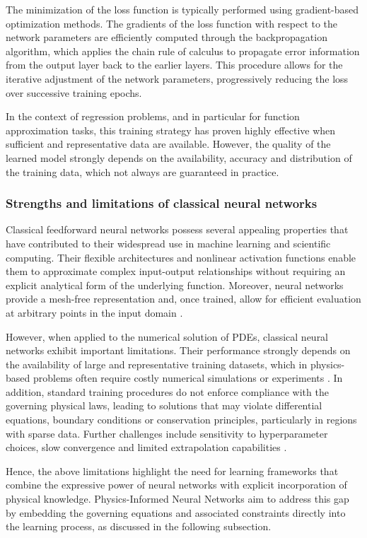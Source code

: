 \documentclass[final,1p,times]{elsarticle}
\theoremstyle{definition}
\begin{document}
The minimization of the loss function is typically performed using gradient-based optimization methods. The gradients of the loss function with respect to the network parameters are efficiently computed through the backpropagation algorithm, which applies the chain rule of calculus to propagate error information from the output layer back to the earlier layers. This procedure allows for the iterative adjustment of the network parameters, progressively reducing the loss over successive training epochs.

In the context of regression problems, and in particular for function approximation tasks, this training strategy has proven highly effective when sufficient and representative data are available. However, the quality of the learned model strongly depends on the availability, accuracy and distribution of the training data, which not always are guaranteed in practice.

\subsubsection{Strengths and limitations of classical neural networks}

Classical feedforward neural networks possess several appealing properties that have contributed to their widespread use in machine learning and scientific computing. Their flexible architectures and nonlinear activation functions enable them to approximate complex input-output relationships without requiring an explicit analytical form of the underlying function. Moreover, neural networks provide a mesh-free representation and, once trained, allow for efficient evaluation at arbitrary points in the input domain \cite{Ojha_2017}.

However, when applied to the numerical solution of PDEs, classical neural networks exhibit important limitations. Their performance strongly depends on the availability of large and representative training datasets, which in physics-based problems often require costly numerical simulations or experiments \cite{linka2023new}. In addition, standard training procedures do not enforce compliance with the governing physical laws, leading to solutions that may violate differential equations, boundary conditions or conservation principles, particularly in regions with sparse data. Further challenges include sensitivity to hyperparameter choices, slow convergence and limited extrapolation capabilities \cite{202504.2577}.

Hence, the above limitations highlight the need for learning frameworks that combine the expressive power of neural networks with explicit incorporation of physical knowledge. Physics-Informed Neural Networks aim to address this gap by embedding the governing equations and associated constraints directly into the learning process, as discussed in the following subsection.
\end{document}
